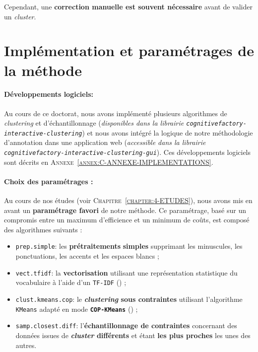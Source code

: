 			Cependant, une \textbf{correction manuelle est souvent nécessaire} avant de valider un \textit{cluster}.
	
	
	\newpage
	\section{Implémentation et paramétrages de la méthode}
		\label{section:5.4-GUIDE-PARAMETRAGES}
		
		\paragraph{\textcolor{colorSilverLakeBlue}{\faCheckSquare} Développements logiciels:}
		
			Au cours de ce doctorat, nous avons implémenté plusieurs algorithmes de \textit{clustering} et d'échantillonnage (\textit{disponibles dans la librairie \texttt{cognitivefactory-interactive-clustering}}) et nous avons intégré la logique de notre méthodologie d'annotation dans une application web (\textit{accessible dans la librairie \texttt{cognitivefactory-interactive-clustering-gui}}).
			Ces développements logiciels sont décrits en \textsc{Annexe~\ref{annex:C-ANNEXE-IMPLEMENTATIONS}}.
		
		\paragraph{\textcolor{colorSilverLakeBlue}{\faCheckSquare} Choix des paramétrages :}
		
			Au cours de nos études (voir \textsc{Chapitre~\ref{chapter:4-ETUDES}}), nous avons mis en avant un \textbf{paramétrage favori} de notre méthode.
			Ce paramétrage, basé sur un compromis entre un maximum d'efficience et un minimum de coûts, est composé des algorithmes suivants :
			
			\begin{itemize}
				\item \texttt{prep.simple}: les \textbf{prétraitements} \textbf{simples} supprimant les minuscules, les ponctuations, les accents et les espaces blancs ;
				\item \texttt{vect.tfidf}: la \textbf{vectorisation} utilisant une représentation statistique du vocabulaire à l'aide d'un \texttt{TF-IDF} (\cite{ramos:2003:using-tfidf-determine}) ;
				\item \texttt{clust.kmeans.cop}: le \textbf{\textit{clustering} sous contraintes} utilisant l'algorithme \texttt{KMeans} adapté en mode \textbf{\texttt{COP-KMeans}} (\cite{wagstaff-etal:2001:constrained-kmeans-clustering}) ;
				\item \texttt{samp.closest.diff}: l'\textbf{échantillonnage de contraintes} concernant des données issues de \textbf{\textit{cluster} différents} et étant \textbf{les plus proches} les unes des autres.
			\end{itemize}
		
